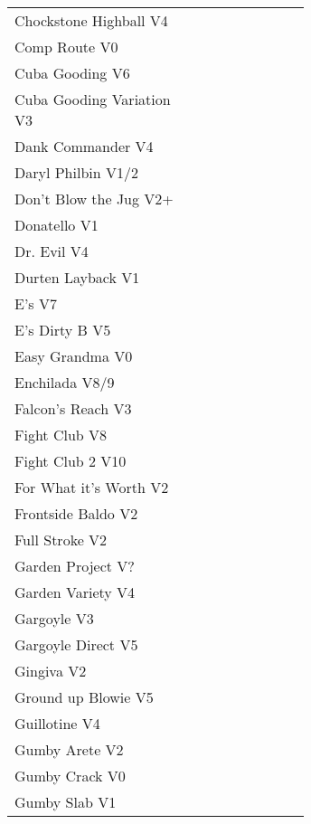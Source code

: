 \begin{flushleft}
\begin{center}
\begin{supertabular}{p{0.65\linewidth}r}
Chockstone Highball V4 & \pageref{rt:Chockstone Highball} \\
Comp Route V0 & \pageref{rt:Comp Route} \\
Cuba Gooding V6 & \pageref{rt:Cuba Gooding} \\
Cuba Gooding Variation V3 & \pageref{vr:Cuba Gooding Variation} \\
Dank Commander V4 & \pageref{rt:Dank Commander} \\
Daryl Philbin V1/2 & \pageref{rt:Daryl Philbin} \\
Don't Blow the Jug V2+ & \pageref{rt:Don't Blow the Jug} \\
Donatello V1 & \pageref{rt:Donatello} \\
Dr. Evil V4 & \pageref{rt:Dr. Evil} \\
Durten Layback V1 & \pageref{rt:Durten Layback} \\
E's V7 & \pageref{rt:E's} \\
E's Dirty B V5 & \pageref{rt:E's Dirty B} \\
Easy Grandma V0 & \pageref{rt:Easy Grandma} \\
Enchilada V8/9 & \pageref{rt:Enchilada} \\
Falcon's Reach V3 & \pageref{rt:Falcon's Reach} \\
Fight Club V8 & \pageref{rt:Fight Club} \\
Fight Club 2 V10 & \pageref{rt:Fight Club 2} \\
For What it's Worth V2 & \pageref{rt:For What it's Worth} \\
Frontside Baldo V2 & \pageref{rt:Frontside Baldo} \\
Full Stroke V2 & \pageref{rt:Full Stroke} \\
Garden Project V? & \pageref{rt:Garden Project} \\
Garden Variety V4 & \pageref{rt:Garden Variety} \\
Gargoyle V3 & \pageref{rt:Gargoyle} \\
Gargoyle Direct V5 & \pageref{vr:Gargoyle Direct} \\
Gingiva V2 & \pageref{rt:Gingiva} \\
Ground up Blowie V5 & \pageref{rt:Ground up Blowie} \\
Guillotine V4 & \pageref{rt:Guillotine} \\
Gumby Arete V2 & \pageref{rt:Gumby Arete} \\
Gumby Crack V0 & \pageref{rt:Gumby Crack} \\
Gumby Slab V1 & \pageref{rt:Gumby Slab} \\

\end{supertabular}
\end{center}
\end{flushleft}
